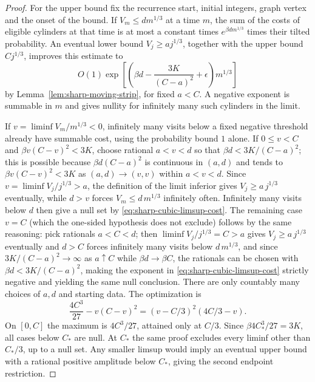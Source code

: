 \documentclass[11pt]{article}
\theoremstyle{definition}
\theoremstyle{remark}
\begin{document}
\begin{proof}
For the upper bound fix the recurrence start, initial integers,
graph vertex and the onset of the bound. If
$V_m\le d m^{1/3}$ at a time $m$, the sum of the costs of
eligible cylinders at that time is at most a constant times
$e^{\beta d m^{1/3}}$ times their tilted probability.
An eventual lower bound $V_j\ge a j^{1/3}$, together with
the upper bound $C j^{1/3}$, improves this estimate to
\begin{equation}
 O(1)\exp\left[
    \left(\beta d-\frac{3K}{(C-a)^2}+\epsilon\right)m^{1/3}
 \right]
 \label{eq:sharp-cubic-limsup-cost}
\end{equation}
by Lemma~\ref{lem:sharp-moving-strip}, for fixed $a<C$.
A negative exponent is summable in $m$ and gives nullity
for infinitely many such cylinders in the limit.

If $v=\liminf V_m/m^{1/3}<0$, infinitely many visits below
a fixed negative threshold already have summable cost,
using the probability bound $1$ alone.
If $0\le v<C$ and $\beta v(C-v)^2<3K$, choose rational
$a<v<d$ so that $\beta d<3K/(C-a)^2$; this is possible because
$\beta d(C-a)^2$ is continuous in $(a,d)$ and tends to
$\beta v(C-v)^2<3K$ as $(a,d)\to(v,v)$ within $a<v<d$.
Since $v=\liminf V_j/j^{1/3}>a$, the definition of the limit
inferior gives $V_j\ge a\,j^{1/3}$ eventually, while $d>v$
forces $V_m\le d\,m^{1/3}$ infinitely often. Infinitely many
visits below $d$ then give a null set by
\eqref{eq:sharp-cubic-limsup-cost}.
The remaining case $v=C$ (which the one-sided hypothesis does
not exclude) follows by the same reasoning: pick rationals
$a<C<d$; then $\liminf V_j/j^{1/3}=C>a$ gives
$V_j\ge a\,j^{1/3}$ eventually and $d>C$ forces infinitely many
visits below $d\,m^{1/3}$, and since $3K/(C-a)^2\to\infty$ as
$a\uparrow C$ while $\beta d\to\beta C$, the rationals can be
chosen with $\beta d<3K/(C-a)^2$, making the exponent in
\eqref{eq:sharp-cubic-limsup-cost} strictly negative and
yielding the same null conclusion.
There are only countably many choices of $a,d$ and starting data.
The optimization is
\[
 \frac{4C^3}{27}-v(C-v)^2
    =(v-C/3)^2(4C/3-v) .
\]
On $[0,C]$ the maximum is $4C^3/27$, attained only at $C/3$.
Since $\beta 4C_*^3/27=3K$, all cases below $C_*$ are null.
At $C_*$ the same proof excludes every liminf other than $C_*/3$,
up to a null set. Any smaller limsup would imply an eventual
upper bound with a rational positive amplitude below $C_*$,
giving the second endpoint restriction.


\end{proof}
\end{document}
